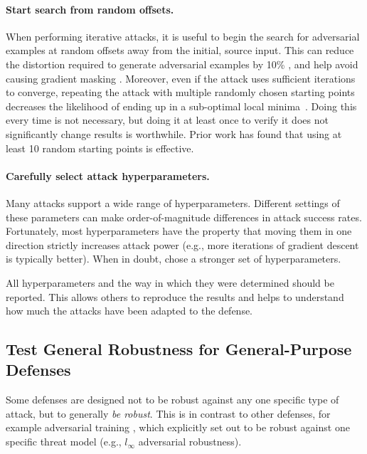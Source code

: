 \documentclass{article} %
\begin{document}
\paragraph{Start search from random offsets.}
%
When performing iterative attacks,
it is useful to begin the search for adversarial examples at random
offsets away from the initial, source input.
%
This can reduce the
distortion required to generate adversarial examples by 10\%
\citep{carlini2017towards}, and help avoid causing gradient masking
\citep{tramer2017ensemble,madry2017towards}.
%
Moreover, even if the attack uses sufficient iterations to converge, repeating the attack with multiple randomly chosen starting points decreases the likelihood of ending up in a sub-optimal local minima~\citep{madry2017towards,mosbach2018logit}.
%
Doing this
every time is not necessary, but doing it at least once to verify it
does not significantly change results is worthwhile.
%
Prior work has found that using at least 10 random starting points is effective.

\paragraph{Carefully select attack hyperparameters.}
%
Many attacks support a wide range of hyperparameters.
%
Different settings of these parameters
can make order-of-magnitude differences in attack success rates.
%
Fortunately, most hyperparameters have the property that moving them in
one direction strictly increases attack power (e.g., more iterations of
gradient descent is typically better).
%
When in doubt, chose a stronger set of hyperparameters.

All hyperparameters and the way in which they were determined should be reported.
%
This allows others to reproduce the results and helps to
understand how much the attacks
have been adapted to the defense.

\subsection{Test General Robustness for General-Purpose Defenses}
\label{sec:generalrobustness}
Some defenses are designed not to be robust against any one specific
type of attack, but to generally \emph{be robust}.
%
This is in contrast to other defenses, for example adversarial training
\citep{goodfellow2014explaining,madry2017towards}, which explicitly set out
to be robust against one specific threat model (e.g., $l_\infty$ adversarial
robustness).
\end{document}

